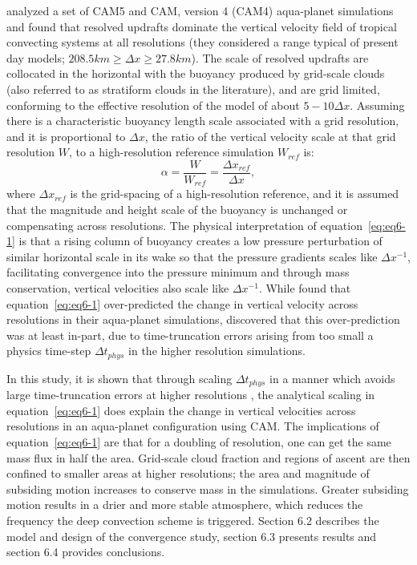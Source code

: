 \cite{HR2017JCLIM,HR2018JAMES} analyzed a set of CAM5 and CAM, version 4 (CAM4) aqua-planet simulations and found that resolved updrafts dominate the vertical velocity field of tropical convecting systems at all resolutions (they considered a range typical of present day models; $208.5 km \geq \Delta x \geq 27.8 km$). The scale of resolved updrafts are collocated in the horizontal with the buoyancy produced by grid-scale clouds (also referred to as stratiform clouds in the literature), and are grid limited, conforming to the effective resolution of the model of about $5-10\Delta x$. Assuming there is a characteristic buoyancy length scale associated with a grid resolution, and it is proportional to $\Delta x$, the ratio of the vertical velocity scale at that grid resolution $W$, to a high-resolution reference simulation $W_{ref}$ is:
\begin{equation}
\alpha = \frac{W}{W_{ref}} = \frac{\Delta x_{ref}}{\Delta x} , \label{eq:eq6-1}
\end{equation}
where $\Delta x_{ref}$ is the grid-spacing of a high-resolution reference, and it is assumed that the magnitude and height scale of the buoyancy is unchanged or compensating across resolutions. The physical interpretation of equation~\ref{eq:eq6-1} is that a rising column of buoyancy creates a low pressure perturbation of similar horizontal scale in its wake so that the pressure gradients scales like $\Delta x^{-1}$, facilitating convergence into the pressure minimum and through mass conservation, vertical velocities also scale like $\Delta x^{-1}$. While \cite{HR2017JCLIM} found that equation~\ref{eq:eq6-1} over-predicted the change in vertical velocity across resolutions in their aqua-planet simulations, \cite{HR2018JAMES} discovered that this over-prediction was at least in-part, due to time-truncation errors arising from too small a physics time-step $\Delta t_{phys}$ in the higher resolution simulations.

In this study, it is shown that through scaling $\Delta t_{phys}$ in a manner which avoids large time-truncation errors at higher resolutions \citep[][Chapter~\ref{sec:chapter5}]{HR2018JAMES}, the analytical scaling in equation~\ref{eq:eq6-1} does explain the change in vertical velocities across resolutions in an aqua-planet configuration using CAM. The implications of equation~\ref{eq:eq6-1} are that for a doubling of resolution, one can get the same mass flux in half the area. Grid-scale cloud fraction and regions of ascent are then confined to smaller areas at higher resolutions; the area and magnitude of subsiding motion increases to conserve mass in the simulations. Greater subsiding motion results in a drier and more stable atmosphere, which reduces the frequency the deep convection scheme is triggered. Section 6.2 describes the model and design of the convergence study, section 6.3 presents results and section 6.4 provides conclusions.


